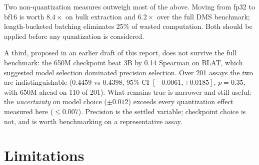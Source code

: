 \documentclass[11pt]{article}
\begin{document}
Two non-quantization measures outweigh most of the above. Moving from fp32 to
bf16 is worth $8.4\times$ on bulk extraction and $6.2\times$ over the full DMS
benchmark; length-bucketed batching eliminates 25\% of wasted computation. Both
should be applied before any quantization is considered.

A third, proposed in an earlier draft of this report, does not survive the full
benchmark: the 650M checkpoint beat 3B by 0.14 Spearman on BLAT, which suggested
model selection dominated precision selection. Over 201 assays the two are
indistinguishable ($0.4459$ vs $0.4398$, 95\% CI $[-0.0061,+0.0185]$,
$p = 0.35$, with 650M ahead on 110 of 201). What remains true is narrower and
still useful: the \emph{uncertainty} on model choice ($\pm 0.012$) exceeds every
quantization effect measured here ($\leq 0.007$). Precision is the settled
variable; checkpoint choice is not, and is worth benchmarking on a
representative assay.

\section{Limitations}
\end{document}

